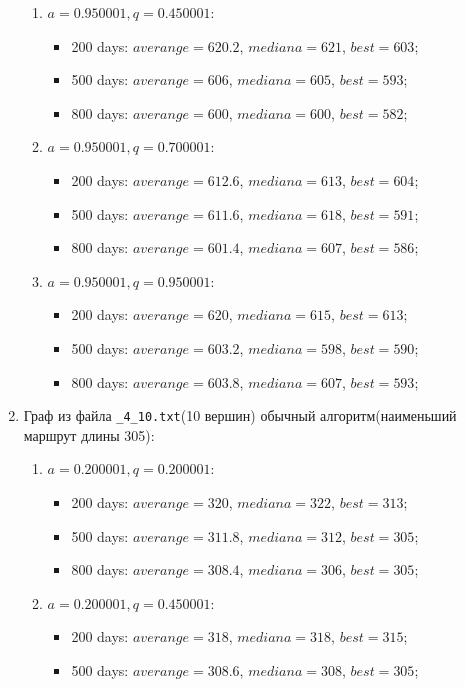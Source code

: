 \begin{enumerate}
\begin{enumerate}
		\item $a= 0.950001, q= 0.450001$:
		\begin{itemize}
			\item 200 days: $averange = 620.2$, $mediana = 621$, $best = 603$;
			\item 500 days: $averange = 606$, $mediana = 605$, $best = 593$;
			\item 800 days: $averange = 600$, $mediana = 600$, $best = 582$;
		\end{itemize}
		\item $a= 0.950001, q= 0.700001$:
		\begin{itemize}
			\item 200 days: $averange = 612.6$, $mediana = 613$, $best = 604$;
			\item 500 days: $averange = 611.6$, $mediana = 618$, $best = 591$;
			\item 800 days: $averange = 601.4$, $mediana = 607$, $best = 586$;
		\end{itemize}
		\item $a= 0.950001, q= 0.950001$:
		\begin{itemize}
			\item 200 days: $averange = 620$, $mediana = 615$, $best = 613$;
			\item 500 days: $averange = 603.2$, $mediana = 598$, $best = 590$;
			\item 800 days: $averange = 603.8$, $mediana = 607$, $best = 593$;
		\end{itemize}
	\end{enumerate}
	\item Граф из файла \texttt{\_4\_10.txt}(10 вершин) обычный алгоритм(наименьший маршрут длины 305):
	\begin{enumerate}
		\item $a= 0.200001, q= 0.200001$:
		\begin{itemize}
			\item 200 days: $averange = 320$, $mediana = 322$, $best = 313$;
			\item 500 days: $averange = 311.8$, $mediana = 312$, $best = 305$;
			\item 800 days: $averange = 308.4$, $mediana = 306$, $best = 305$;
		\end{itemize}
		\item $a= 0.200001, q= 0.450001$:
		\begin{itemize}
			\item 200 days: $averange = 318$, $mediana = 318$, $best = 315$;
			\item 500 days: $averange = 308.6$, $mediana = 308$, $best = 305$;

\end{itemize}
\end{enumerate}
\end{enumerate}
